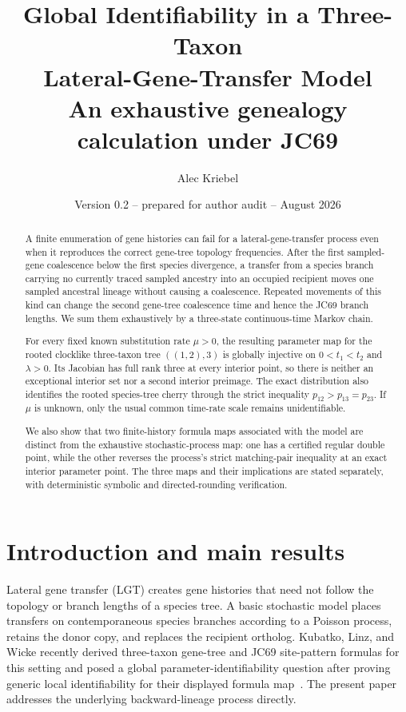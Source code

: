 \documentclass[11pt]{article}
\title{\bfseries Global Identifiability in a Three-Taxon\\
Lateral-Gene-Transfer Model\\[0.35em]
\large An exhaustive genealogy calculation under JC69}
\author{Alec Kriebel}
\date{Version 0.2 -- prepared for author audit -- August 2026}
\begin{document}
\maketitle

\begin{abstract}
A finite enumeration of gene histories can fail for a lateral-gene-transfer process even when it reproduces the correct gene-tree topology frequencies.  After the first sampled-gene coalescence below the first species divergence, a transfer from a species branch carrying no currently traced sampled ancestry into an occupied recipient moves one sampled ancestral lineage without causing a coalescence.  Repeated movements of this kind can change the second gene-tree coalescence time and hence the JC69 branch lengths.  We sum them exhaustively by a three-state continuous-time Markov chain.

For every fixed known substitution rate $\mu>0$, the resulting parameter map for the rooted clocklike three-taxon tree $((1,2),3)$ is globally injective on $0<t_1<t_2$ and $\lambda>0$.  Its Jacobian has full rank three at every interior point, so there is neither an exceptional interior set nor a second interior preimage.  The exact distribution also identifies the rooted species-tree cherry through the strict inequality $p_{12}>p_{13}=p_{23}$.  If $\mu$ is unknown, only the usual common time-rate scale remains unidentifiable.

We also show that two finite-history formula maps associated with the model are distinct from the exhaustive stochastic-process map: one has a certified regular double point, while the other reverses the process's strict matching-pair inequality at an exact interior parameter point.  The three maps and their implications are stated separately, with deterministic symbolic and directed-rounding verification.
\end{abstract}

\tableofcontents

\section{Introduction and main results}\label{sec:introduction}

Lateral gene transfer (LGT) creates gene histories that need not follow the topology or branch lengths of a species tree.  A basic stochastic model places transfers on contemporaneous species branches according to a Poisson process, retains the donor copy, and replaces the recipient ortholog.  Kubatko, Linz, and Wicke recently derived three-taxon gene-tree and JC69 site-pattern formulas for this setting and posed a global parameter-identifiability question after proving generic local identifiability for their displayed formula map~\cite{KLW2026}.  The present paper addresses the underlying backward-lineage process directly.
\end{document}
